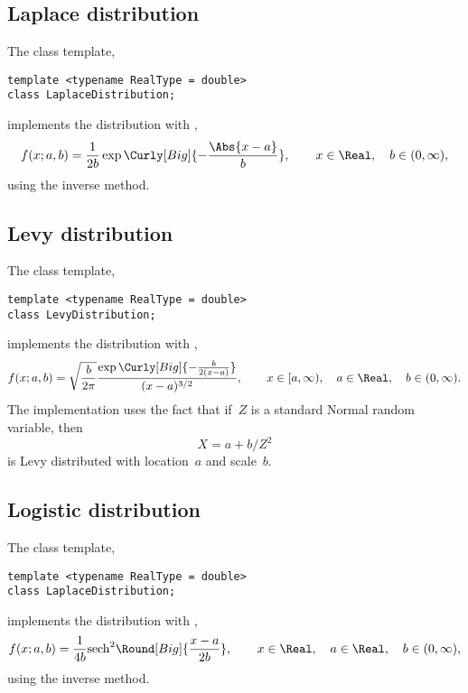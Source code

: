 \subsection{Laplace distribution}
\label{sub:Laplace distribution}

The class template,
\begin{verbatim}
template <typename RealType = double>
class LaplaceDistribution;
\end{verbatim}
implements the distribution with \pdf,
\begin{equation*}
  f(x;a,b) = \frac{1}{2b}\exp\Curly[Big]{-\frac{\Abs{x - a}}{b}},\qquad
  x \in \Real,\quad b \in (0, \infty),
\end{equation*}
using the inverse method.

\subsection{Levy distribution}
\label{sub:Levy distribution}

The class template,
\begin{verbatim}
template <typename RealType = double>
class LevyDistribution;
\end{verbatim}
implements the distribution with \pdf,
\begin{equation*}
  f(x;a,b) =
  \sqrt{\frac{b}{2\pi}}
  \frac{\exp\Curly[Big]{-\frac{b}{2(x - a)}}}{(x - a)^{3/2}},\qquad
  x \in [a, \infty),\quad a \in \Real,\quad b \in (0, \infty).
\end{equation*}
The implementation uses the fact that if~$Z$ is a standard Normal random
variable, then
\begin{equation*}
  X = a + b / Z^2
\end{equation*}
is Levy distributed with location~$a$ and scale~$b$.

\subsection{Logistic distribution}
\label{sub:Logistic distribution}

The class template,
\begin{verbatim}
template <typename RealType = double>
class LaplaceDistribution;
\end{verbatim}
implements the distribution with \pdf,
\begin{equation*}
  f(x;a,b) = \frac{1}{4b}\mathrm{sech}^2\Round[Big]{\frac{x - a}{2b}},\qquad
  x \in \Real,\quad a \in \Real,\quad b \in (0, \infty),
\end{equation*}
using the inverse method.

